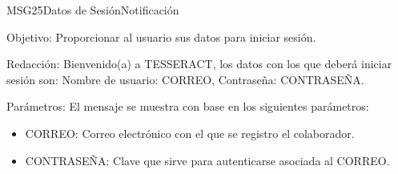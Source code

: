 \begin{mensaje}{MSG25}{Datos de Sesión}{Notificación}
	\item [Objetivo:] Proporcionar al usuario sus datos para iniciar sesión.
	\item[Redacción:] Bienvenido(a) a TESSERACT, los datos con los que deberá iniciar sesión son: Nombre de usuario: CORREO, Contraseña: CONTRASEÑA.
	\item[Parámetros:] El mensaje se muestra con base en los siguientes parámetros:
	\begin{itemize}
		\item CORREO: Correo electrónico con el que se registro el colaborador.
		\item CONTRASEÑA: Clave que sirve para autenticarse asociada al CORREO.
	\end{itemize}
\end{mensaje}